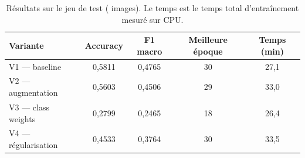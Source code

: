 \begin{table}[H]
\centering
\small
\caption{Résultats sur le jeu de test (\TestSize{} images). Le temps est le
temps total d'entraînement mesuré sur CPU.}
\label{tab:resultats}
\begin{tabular}{lcccc}
\toprule
Variante & Accuracy & F1 macro & Meilleure époque & Temps (min) \\
\midrule
V1 --- baseline & 0,5811 & 0,4765 & 30 & 27,1 \\
V2 --- augmentation & 0,5603 & 0,4506 & 29 & 33,0 \\
V3 --- class weights & 0,2799 & 0,2465 & 18 & 26,4 \\
V4 --- régularisation & 0,4533 & 0,3764 & 30 & 33,5 \\
\bottomrule
\end{tabular}
\end{table}
